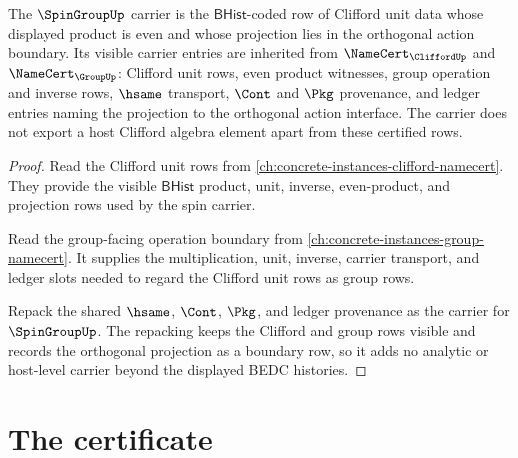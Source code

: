 \begin{theorem}
\label{thm:spingroup-clifford-even-unit-carrier-obligation}
The $\SpinGroupUp$ carrier is the $\mathsf{BHist}$-coded row of Clifford unit
data whose displayed product is even and whose projection lies in the
orthogonal action boundary. Its visible carrier entries are inherited from
$\NameCert_{\CliffordUp}$ and $\NameCert_{\GroupUp}$: Clifford unit rows, even
product witnesses, group operation and inverse rows, $\hsame$ transport,
$\Cont$ and $\Pkg$ provenance, and ledger entries naming the projection to the
orthogonal action interface. The carrier does not export a host Clifford
algebra element apart from these certified rows.
\end{theorem}
\begin{proof}
Read the Clifford unit rows from
\autoref{ch:concrete-instances-clifford-namecert}. They provide the visible
$\mathsf{BHist}$ product, unit, inverse, even-product, and projection rows used
by the spin carrier.

Read the group-facing operation boundary from
\autoref{ch:concrete-instances-group-namecert}. It supplies the multiplication,
unit, inverse, carrier transport, and ledger slots needed to regard the
Clifford unit rows as group rows.

Repack the shared $\hsame$, $\Cont$, $\Pkg$, and ledger provenance as the
carrier for $\SpinGroupUp$. The repacking keeps the Clifford and group rows
visible and records the orthogonal projection as a boundary row, so it adds no
analytic or host-level carrier beyond the displayed BEDC histories.
\end{proof}

\section{The certificate}
\label{sec:spingroup-certificate}

